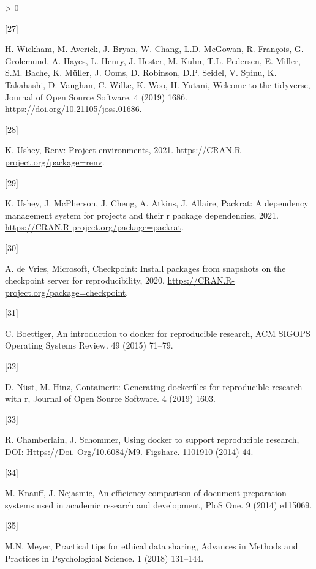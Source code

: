 \documentclass[]{elsarticle} %
\newlength{\csllabelwidth}
\newlength{\cslhangindent}
\newenvironment{CSLReferences}[3] %
 {%
  \setlength{\parindent}{0pt}
  \ifodd #1 \everypar{\setlength{\hangindent}{\cslhangindent}}\ignorespaces\fi
  \ifnum #2 > 0
  \setlength{\parskip}{#2\baselineskip}
  \fi
 }%
 {}
\newcommand{\CSLLeftMargin}[1]{\parbox[t]{\csllabelwidth}{#1}}
\newcommand{\CSLRightInline}[1]{\parbox[t]{\linewidth - \csllabelwidth}{#1}}
\begin{document}
\begin{CSLReferences}{0}{0}
\leavevmode\hypertarget{ref-wickham2019}{}%
\CSLLeftMargin{{[}27{]} }
\CSLRightInline{H. Wickham, M. Averick, J. Bryan, W. Chang, L.D.
McGowan, R. François, G. Grolemund, A. Hayes, L. Henry, J. Hester, M.
Kuhn, T.L. Pedersen, E. Miller, S.M. Bache, K. Müller, J. Ooms, D.
Robinson, D.P. Seidel, V. Spinu, K. Takahashi, D. Vaughan, C. Wilke, K.
Woo, H. Yutani, Welcome to the {tidyverse}, Journal of Open Source
Software. 4 (2019) 1686. \url{https://doi.org/10.21105/joss.01686}.}

\leavevmode\hypertarget{ref-renv}{}%
\CSLLeftMargin{{[}28{]} }
\CSLRightInline{K. Ushey, Renv: Project environments, 2021.
\url{https://CRAN.R-project.org/package=renv}.}

\leavevmode\hypertarget{ref-ushley2021packrat}{}%
\CSLLeftMargin{{[}29{]} }
\CSLRightInline{K. Ushey, J. McPherson, J. Cheng, A. Atkins, J. Allaire,
Packrat: A dependency management system for projects and their r package
dependencies, 2021. \url{https://CRAN.R-project.org/package=packrat}.}

\leavevmode\hypertarget{ref-devries2020checkpoint}{}%
\CSLLeftMargin{{[}30{]} }
\CSLRightInline{A. de Vries, Microsoft, Checkpoint: Install packages
from snapshots on the checkpoint server for reproducibility, 2020.
\url{https://CRAN.R-project.org/package=checkpoint}.}

\leavevmode\hypertarget{ref-boettiger2015introduction}{}%
\CSLLeftMargin{{[}31{]} }
\CSLRightInline{C. Boettiger, An introduction to docker for reproducible
research, ACM SIGOPS Operating Systems Review. 49 (2015) 71--79.}

\leavevmode\hypertarget{ref-nust2019containerit}{}%
\CSLLeftMargin{{[}32{]} }
\CSLRightInline{D. Nüst, M. Hinz, Containerit: Generating dockerfiles
for reproducible research with r, Journal of Open Source Software. 4
(2019) 1603.}

\leavevmode\hypertarget{ref-chamberlain2014using}{}%
\CSLLeftMargin{{[}33{]} }
\CSLRightInline{R. Chamberlain, J. Schommer, Using docker to support
reproducible research, DOI: Https://Doi. Org/10.6084/M9. Figshare.
1101910 (2014) 44.}

\leavevmode\hypertarget{ref-knauff2014efficiency}{}%
\CSLLeftMargin{{[}34{]} }
\CSLRightInline{M. Knauff, J. Nejasmic, An efficiency comparison of
document preparation systems used in academic research and development,
PloS One. 9 (2014) e115069.}

\leavevmode\hypertarget{ref-meyer2018practical}{}%
\CSLLeftMargin{{[}35{]} }
\CSLRightInline{M.N. Meyer, Practical tips for ethical data sharing,
Advances in Methods and Practices in Psychological Science. 1 (2018)
131--144.}


\end{CSLReferences}
\end{document}
